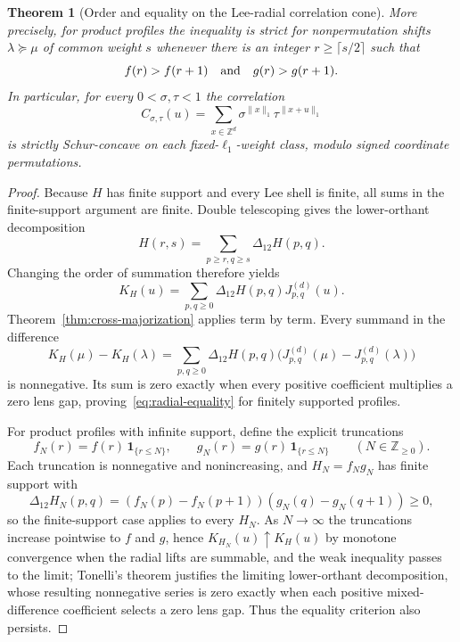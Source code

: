 \documentclass[pdflatex,sn-mathphys-num]{sn-jnl}
\theoremstyle{thmstyleone}
\newtheorem{theorem}{Theorem}[section]
\theoremstyle{thmstylethree}
\theoremstyle{thmstyletwo}
\newcommand{\Z}{\mathbb Z}
\begin{document}
\begin{appendices}
\begin{theorem}[Order and equality on the Lee-radial correlation cone]
More precisely, for product profiles the inequality is strict for
nonpermutation shifts $\lambda\succeq\mu$ of common weight $s$ whenever
there is an integer $r\ge\lceil s/2\rceil$ such that
\begin{equation}
 f(r)>f(r+1)\quad\hbox{and}\quad g(r)>g(r+1).       \label{eq:radial-strict}
\end{equation}
In particular, for every $0<\sigma,\tau<1$ the correlation
\begin{equation}
 C_{\sigma,\tau}(u)=
 \sum_{x\in\Z^d}\sigma^{\|x\|_1}\tau^{\|x+u\|_1}  \label{eq:lee-geometric-correlation}
\end{equation}
is strictly Schur-concave on each fixed-$\ell_1$-weight class, modulo signed
coordinate permutations.
\end{theorem}

\begin{proof}
Because $H$ has finite support and every Lee shell is finite, all sums in the
finite-support argument are finite.  Double telescoping gives the
lower-orthant decomposition
\[
 H(r,s)=\sum_{p\ge r,q\ge s}\Delta_{12}H(p,q).
\]
Changing the order of summation therefore yields
\[
 K_H(u)=\sum_{p,q\ge0}\Delta_{12}H(p,q)
             J_{p,q}^{(d)}(u).
\]
Theorem~\ref{thm:cross-majorization} applies term by term.  Every summand in
the difference
\[
 K_H(\mu)-K_H(\lambda)=\sum_{p,q\ge0}\Delta_{12}H(p,q)
 \bigl(J_{p,q}^{(d)}(\mu)-J_{p,q}^{(d)}(\lambda)\bigr)
\]
is nonnegative.  Its sum is zero exactly when every positive coefficient
multiplies a zero lens gap, proving~\eqref{eq:radial-equality} for finitely
supported profiles.

For product profiles with infinite support, define the explicit truncations
\[
 f_N(r)=f(r)\,\mathbf 1_{\{r\le N\}},\qquad
 g_N(r)=g(r)\,\mathbf 1_{\{r\le N\}}\qquad(N\in\Z_{\ge0}).
\]
Each truncation is nonnegative and nonincreasing, and
$H_N=f_Ng_N$ has finite support with
\[
 \Delta_{12}H_N(p,q)=(f_N(p)-f_N(p+1))(g_N(q)-g_N(q+1))\ge0,
\]
so the finite-support case applies to every $H_N$.  As $N\to\infty$ the
truncations increase pointwise to $f$ and $g$, hence
$K_{H_N}(u)\uparrow K_H(u)$ by monotone convergence when the radial lifts
are summable, and the weak inequality passes to the limit; Tonelli's theorem
justifies the limiting lower-orthant decomposition, whose resulting
nonnegative series is zero exactly when each positive mixed-difference
coefficient selects a zero lens gap.  Thus the equality criterion also
persists.


\end{proof}
\end{appendices}
\end{document}
